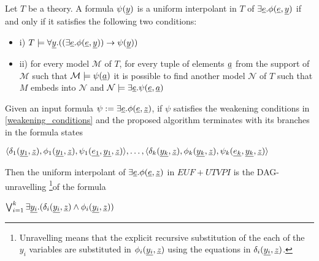 \begin{lemma} \cite{10.1007/978-3-030-29436-6_9} \label{cover_extension_lemma}
  Let $T$ be a theory. 
  A formula $\psi(\underline{y})$ is a uniform interpolant
  in $T$ of $\exists \underline{e} . \phi (\underline{e}, \underline{y})$
  if and only if it satisfies the following two conditions:

  \begin{itemize}
    \item[] i) $T \models \forall \underline{y}. ((\exists \underline{e} . 
    \phi(\underline{e}, \underline{y})) \rightarrow \psi(\underline{y}))$
  \item[] ii) for every model $\mathcal{M}$ of $T$, for every
  tuple of elements $\underline{a}$ from the support of $\mathcal{M}$
  such that $\mathcal{M} \models \psi(\underline{a})$ it is 
  possible to find another model $\mathcal{N}$ of $T$
  such that $M$ embeds into $\mathcal{N}$ and $\mathcal{N}
  \models \exists \underline{e} . \psi (\underline{e}, \underline{a})$
  \end{itemize}
\end{lemma}

\begin{theorem}
  Given an input formula
  $\psi := \exists \underline{e}. \phi(\underline{e}, \underline{z})$, 
  if $\psi$ satisfies the weakening conditions in 
  \ref{weakening_conditions} and the proposed algorithm
  terminates with its branches in the formula states

  $\langle 
  \delta_1(\underline{y_1}, \underline{z}), 
  \phi_1(\underline{y_1}, \underline{z}),
  \psi_1(\underline{e_1}, \underline{y_1}, \underline{z})
  \rangle, \dots, \langle 
  \delta_k(\underline{y_k}, \underline{z}), 
  \phi_k(\underline{y_k}, \underline{z}),
  \psi_k(\underline{e_k}, \underline{y_k}, \underline{z})
  \rangle$

  Then the uniform interpolant of $\exists \underline{e} . \phi(\underline{e},
\underline{z})$ in $EUF + UTVPI$ is the DAG-unravelling \footnote{
  Unravelling means that the explicit recursive 
  substitution of the each of the $y_i$
  variables are substituted in $\phi_i(\underline{y_i}, \underline{z})$ using
  the equations in $\delta_i(\underline{y_i}, \underline{z})$.
}of the formula 

$\bigvee_{i=1}^k \exists \underline{y_i} . (\delta_i(\underline{y_i}, \underline{z}) \land \phi_i(\underline{y_i}, \underline{z}))$

\end{theorem}

